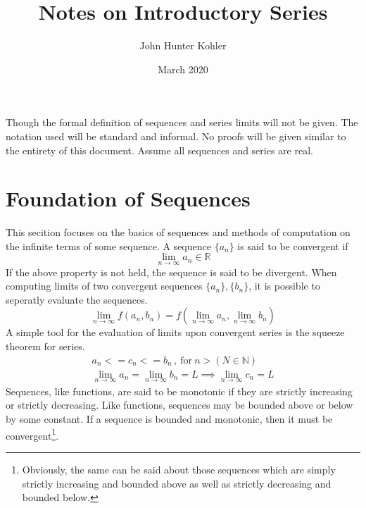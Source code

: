 \documentclass[11pt]{article}
\title{Notes on Introductory Series}
\author{John Hunter Kohler}
\date{March 2020}
\begin{document}
\maketitle

\quad Though the formal definition of sequences and series limits will not be given. The notation used will be standard and 
informal. No proofs will be given similar to the entirety of this document. Assume all sequences and series are real.

\section*{Foundation of Sequences}
	This secition focuses on the basics of sequences and methods of computation on the infinite terms of some sequence. 
	A sequence $\{a_n\}$ is said to be convergent if
		\begin{equation}
			\lim_{n\to\infty} a_n \in\mathbb{R}
		\end{equation}
	If the above property is not held, the sequence is said to be divergent. When computing limits of two 
	convergent sequences $\{a_n\},\{b_n\}$, it is possible to seperatly evaluate the sequences.
		\begin{equation}
			\lim_{n\to\infty} f(a_n,b_n) = f(\lim_{n\to\infty} a_n, \lim_{n\to\infty} b_n)
		\end{equation}
	A simple tool for the evaluation of limits upon convergent series is the squeeze theorem for series.
		\begin{gather}
			a_n <= c_n <= b_n\,,\ \text{for} \ n > (N\in\mathbb{N}) \\ 
			\lim_{n\to\infty} a_n = \lim_{n\to\infty} b_n = L
			\implies \lim_{n\to\infty} c_n = L
		\end{gather}
	Sequences, like functions, are said to be monotonic if they are strictly increasing or strictly decreasing.
	Like functions, sequences may be bounded above or below by some constant. If a sequence is bounded and monotonic, 
	then it must be convergent\footnote{Obviously, the same can be said about those sequences which are simply strictly increasing and 
	bounded above as well as strictly decreasing and bounded below.}.
\end{document}
